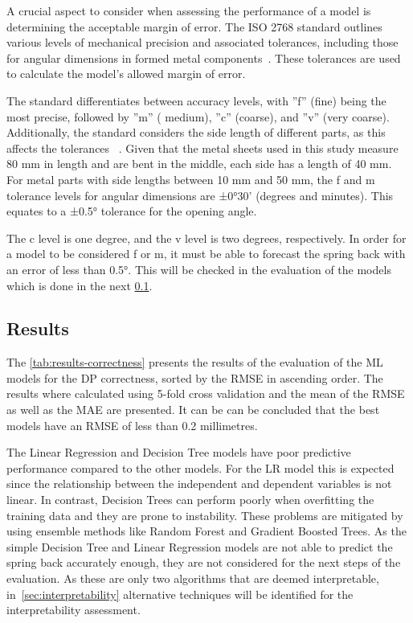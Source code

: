 A crucial aspect to consider when assessing the performance of a model is determining the acceptable margin of error.
The ISO 2768 standard outlines various levels of mechanical precision and associated tolerances, including those for
angular dimensions in formed metal components~\cite[pp. 1--3]{ISO2768}.
These tolerances are used to calculate the model's allowed margin of error.

The standard differentiates between accuracy levels, with ''f'' (fine) being the most precise, followed by ''m'' (
medium), ''c'' (coarse), and ''v'' (very coarse).
Additionally, the standard considers the side length of different parts, as this affects the tolerances
~\cite[p. 3]{ISO2768}.
Given that the metal sheets used in this study measure 80 mm in length and are bent in the middle, each side has a
length of 40 mm.
For metal parts with side lengths between 10 mm and 50 mm, the f and m tolerance levels for angular
dimensions are ±0°30' (degrees and minutes).
This equates to a ±0.5° tolerance for the opening angle.

The c level is one degree, and the v level is two degrees, respectively.
In order for a model to be considered f or m, it must be able to forecast the spring back with an error of less than
0.5°.
This will be checked in the evaluation of the models which is done in the next \cref{subsec:results}.

\subsection{Results}\label{subsec:results}
The \cref{tab:results-correctness} presents the results of the evaluation of the \ac{ML} models for
the \ac{DP} correctness, sorted by the RMSE in ascending order.
The results where calculated using 5-fold cross validation and the mean of the RMSE as well as the MAE are presented.
It can be can be concluded that the best models have an RMSE of less than 0.2 millimetres.

The Linear Regression and Decision Tree models have poor predictive performance compared to the other models.
For the \ac{LR} model this is expected since the relationship between the independent and dependent variables is
not linear.
In contrast, Decision Trees can perform poorly when overfitting the training data and they are prone to
instability.
These problems are mitigated by using ensemble methods like Random Forest and Gradient Boosted Trees.
As the simple Decision Tree and Linear Regression models are not able to predict the spring back accurately enough,
they are not considered for the next steps of the evaluation.
As these are only two algorithms that are deemed interpretable, in~\cref{sec:interpretability} alternative techniques
will be identified for the interpretability assessment.

